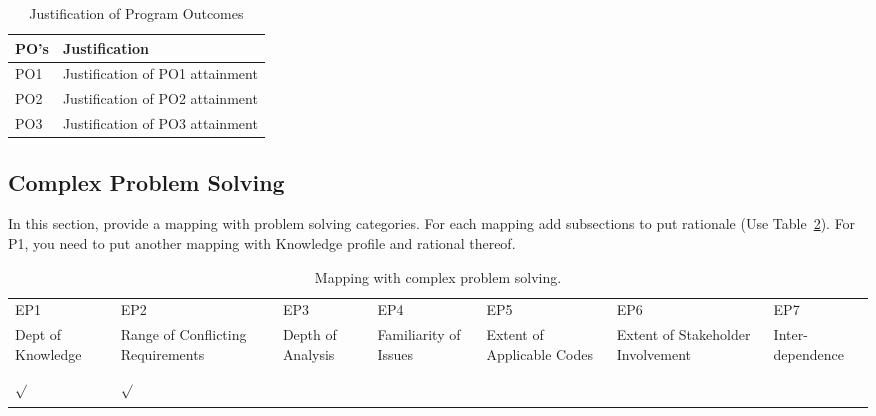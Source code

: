 \begin{center}
    \begin{table}[ht]
        \centering
        \caption{Justification of Program Outcomes}
        \begin{tabular}{|p{}|p{}|}
            \hline
            \textbf{PO's} & \textbf{Justification} \\
            \hline
            PO1 & Justification of PO1 attainment \\
            \hline
            PO2 & Justification of PO2 attainment \\
            \hline
            PO3 & Justification of PO3 attainment \\
            \hline
        \end{tabular}
        \label{tab:po_justification}
    \end{table}
\end{center}



\subsection{Complex Problem Solving} 
In this section, provide a mapping with problem solving categories. For each mapping add subsections to put rationale (Use Table~\ref{tab:p_solve}). For P1, you need to put another mapping with Knowledge profile and rational thereof.
\begin{center}
    \begin{table}[ht]
        \centering
        \caption{Mapping with complex problem solving.}
        \begin{tabular}{|p{}|p{}|p{}|p{}|p{}|p{}|p{}|}
        \hline
        EP1& EP2& EP3& EP4& EP5& EP6& EP7\\
        Dept of Knowledge & Range of Conflicting Requirements & Depth of Analysis & Familiarity of Issues & Extent of Applicable Codes & Extent of Stakeholder Involvement & Inter-dependence\\
        \hline 
        $\sqrt{}$ & $\sqrt{}$ &&&&&\\
        &&&&&&\\
        \hline 
        \end{tabular}
        \label{tab:p_solve}
    \end{table}
\end{center}


